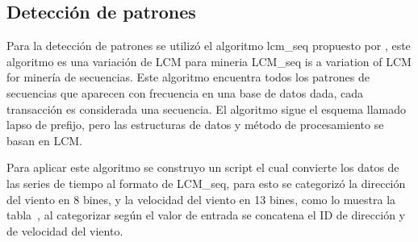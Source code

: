 \subsection{Detección de patrones}

Para la detección de patrones se utilizó el algoritmo lcm\_seq propuesto por \cite{uno_lcm_seq},
este algoritmo es una variación de LCM para mineria
LCM\_seq is a variation of LCM for minería de secuencias. 
Este algoritmo encuentra todos los patrones de secuencias que aparecen con frecuencia
en una base de datos dada, cada transacción es considerada una secuencia. El algoritmo sigue el esquema 
llamado lapso de prefijo, pero las estructuras de datos y método de procesamiento se basan en LCM.


Para aplicar este algoritmo se construyo un script el cual convierte los datos de las series de tiempo al
formato de LCM\_seq, para esto se categorizó la dirección del viento en 8 bines, y la velocidad del viento en 13 bines,
como lo muestra la tabla~, al categorizar según el valor de entrada se concatena el ID de dirección y de velocidad del viento.

\begin{table}
\caption{IDs de velocidad y dirección de viento para cada grupo}
\label{table:iddirspeed}
\centering
{}
\end{table}

